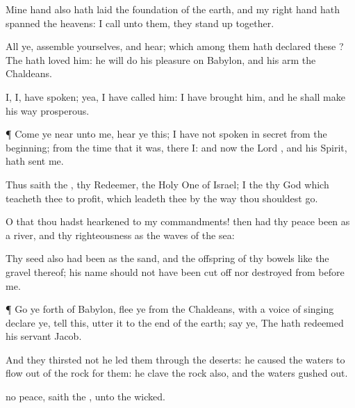 {Mine
hand also hath laid the
foundation of the
earth, and my right
hand hath
spanned the
heavens:
{} I
call unto them, they stand
up
together.

All ye,
assemble yourselves, and
hear; which among them hath
declared these
{}? The
{} hath
loved him: he will
do his
pleasure on
Babylon, and his
arm
{} the
Chaldeans.

I,
{} I, have
spoken; yea, I have
called him: I have
brought him, and he shall make his
way
prosperous.


\par }{\PP {}¶
Come ye
near unto me,
hear ye this; I have not
spoken in
secret from the
beginning; from the
time that it was, there
{} I: and now the
Lord
{}, and his
Spirit, hath
sent me.

Thus
saith the
{}, thy
Redeemer, the Holy
One of
Israel; I
{} the
{} thy
God which
teacheth thee to
profit, which
leadeth thee by the
way
{} thou shouldest
go.

O
that thou hadst
hearkened to my
commandments! then had thy
peace been as a
river, and thy
righteousness as the
waves of the
sea:

Thy
seed also had been as the
sand, and the
offspring of thy
bowels like the
gravel thereof; his
name should not have been cut
off nor
destroyed from
before me.


\par }{\PP {}¶ Go ye
forth of
Babylon,
flee ye from the
Chaldeans, with a
voice of
singing
declare ye,
tell this,
utter it
{} to the
end of the
earth;
say ye, The
{} hath
redeemed his
servant
Jacob.

And they
thirsted not
{} he
led them through the
deserts: he caused the
waters to
flow out of the
rock for them: he
clave the
rock also, and the
waters gushed
out.

 no
peace,
saith the
{}, unto the
wicked.




\par }
